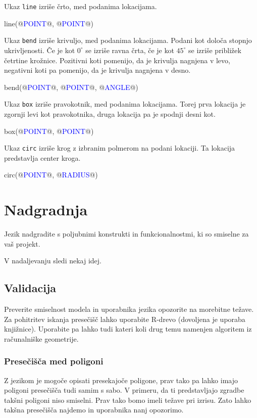 \documentclass{article}
\newcommand\Var[1]{\textcolor{blue}{#1}}
\newcommand\Fun[1]{{\texttt{#1}}}
\begin{document}
Ukaz \Fun{line} izriše črto, med podanima lokacijama.
\begin{CITY}
  line(@\Var{POINT}@, @\Var{POINT}@)
\end{CITY}

Ukaz \Fun{bend} izriše krivuljo, med podanima lokacijama.
Podani kot določa stopnjo ukrivljenosti.
Če je kot $0^\circ$ se izriše ravna črta, če je kot $45^\circ$ se izriše približek četrtine krožnice.
Pozitivni koti pomenijo, da je krivulja nagnjena v levo, negativni koti pa pomenijo, da je krivulja nagnjena v desno.

\begin{CITY}
  bend(@\Var{POINT}@, @\Var{POINT}@, @\Var{ANGLE}@)
\end{CITY}

Ukaz \Fun{box} izriše pravokotnik, med podanima lokacijama.
Torej prva lokacija je zgornji levi kot pravokotnika, druga lokacija pa je spodnji desni kot.
\begin{CITY}
  box(@\Var{POINT}@, @\Var{POINT}@)
\end{CITY}

Ukaz \Fun{circ} izriše krog z izbranim polmerom na podani lokaciji.
Ta lokacija predstavlja center kroga.
\begin{CITY}
  circ(@\Var{POINT}@, @\Var{RADIUS}@)
\end{CITY}

\section{Nadgradnja}
Jezik nadgradite s poljubnimi konstrukti in funkcionalnostmi, ki so smiselne za vaš projekt.

V nadaljevanju sledi nekaj idej.

\subsection{Validacija}
Preverite smiselnost modela in uporabnika jezika opozorite na morebitne težave.
Za pohitritev iskanja presečišč lahko uporabite R-drevo (dovoljena je uporaba knjižnice).
Uporabite pa lahko tudi kateri koli drug temu namenjen algoritem iz računalniške geometrije.

\newpage

\subsubsection{Presečišča med poligoni}
Z jezikom je mogoče opisati presekajoče poligone, prav tako pa lahko imajo poligoni presečišča tudi samim s sabo.
V primeru, da ti predstavljajo zgradbe takšni poligoni niso smiselni.
Prav tako bomo imeli težave pri izrisu.
Zato lahko takšna presečišča najdemo in uporabnika nanj opozorimo.
\end{document}
